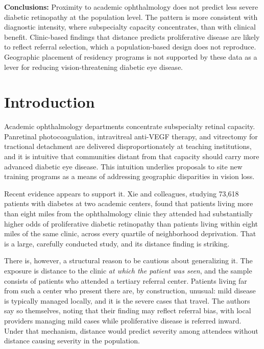 \documentclass[11pt]{article}
\begin{document}
\noindent\textbf{Conclusions:} Proximity to academic ophthalmology does not
predict less severe diabetic retinopathy at the population level. The pattern is
more consistent with diagnostic intensity, where subspecialty capacity
concentrates, than with clinical benefit. Clinic-based findings that distance
predicts proliferative disease are likely to reflect referral selection, which a
population-based design does not reproduce. Geographic placement of residency
programs is not supported by these data as a lever for reducing
vision-threatening diabetic eye disease.

\clearpage

\section{Introduction}

Academic ophthalmology departments concentrate subspecialty retinal capacity.
Panretinal photocoagulation, intravitreal anti-VEGF therapy, and vitrectomy for
tractional detachment are delivered disproportionately at teaching institutions,
and it is intuitive that communities distant from that capacity should carry
more advanced diabetic eye disease. This intuition underlies proposals to site
new training programs as a means of addressing geographic disparities in vision
loss.

Recent evidence appears to support it. Xie and colleagues, studying 73,618
patients with diabetes at two academic centers, found that patients living more
than eight miles from the ophthalmology clinic they attended had substantially
higher odds of proliferative diabetic retinopathy than patients living within
eight miles of the same clinic, across every quartile of neighborhood
deprivation.\citep{xie2025} That is a large, carefully conducted study, and its
distance finding is striking.

There is, however, a structural reason to be cautious about generalizing it. The
exposure is distance to the clinic \emph{at which the patient was seen}, and the
sample consists of patients who attended a tertiary referral center. Patients
living far from such a center who present there are, by construction, unusual:
mild disease is typically managed locally, and it is the severe cases that
travel. The authors say so themselves, noting that their finding may reflect
referral bias, with local providers managing mild cases while proliferative
disease is referred inward.\citep{xie2025} Under that mechanism, distance would
predict severity among attendees without distance causing severity in the
population.
\end{document}
